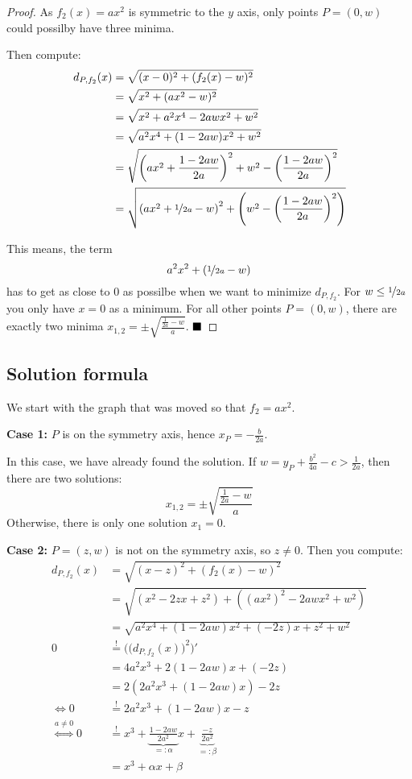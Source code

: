\begin{proof}
As $f_2(x) = ax^2$ is symmetric to the $y$ axis, only points 
$P = (0, w)$ could possilby have three minima.

Then compute:
\begin{align}
  d_{P,{f_2}}(x)  &= \sqrt{(x-0)^2 + (f_2(x)-w)^2}\\
    &= \sqrt{x^2 + (ax^2-w)^2}\\
    &= \sqrt{x^2 + a^2 x^4-2aw x^2+w^2}\\
    &= \sqrt{a^2 x^4 + (1-2aw) x^2 + w^2}\\
    &= \sqrt{\left (a x^2 + \frac{1-2 a w}{2a} \right )^2 + w^2 - \left (\frac{1-2 a w}{2a} \right )^2}\\
    &= \sqrt{\left (a x^2 + \nicefrac{1}{2a}- w \right )^2 + \left (w^2 - \left (\frac{1-2 a w}{2a} \right )^2 \right)}
\end{align}

This means, the term
\[a^2 x^2 + (\nicefrac{1}{2a}- w)\]
has to get as close to $0$ as possilbe when we want to minimize 
$d_{P,{f_2}}$. For $w \leq \nicefrac{1}{2a}$ you only have $x = 0$ as a minimum.
For all other points $P = (0, w)$, there are exactly two minima $x_{1,2} = \pm \sqrt{\frac{\frac{1}{2a} - w}{a}}$.
$\qed$
\end{proof}

\subsection{Solution formula}
We start with the graph that was moved so that $f_2 = ax^2$.

\textbf{Case 1:} $P$ is on the symmetry axis, hence $x_P = - \frac{b}{2a}$.

In this case, we have already found the solution. If $w = y_P + \frac{b^2}{4a} - c > \frac{1}{2a}$,
then there are two solutions:
\[x_{1,2} = \pm \sqrt{\frac{\frac{1}{2a} - w}{a}}\]
Otherwise, there is only one solution $x_1 = 0$.

\textbf{Case 2:} $P = (z, w)$ is not on the symmetry axis, so $z \neq 0$. Then you compute:
\begin{align}
  d_{P,{f_2}}(x)  &= \sqrt{(x-z)^2 + (f_2(x)-w)^2}\\
    &= \sqrt{(x^2 - 2zx + z^2) + ((ax^2)^2 - 2 awx^2 + w^2)}\\
    &= \sqrt{a^2x^4 + (1- 2 aw)x^2 +(- 2z)x + z^2 + w^2}\\
  0 &\stackrel{!}{=} \Big(\big(d_{P, {f_2}}(x)\big)^2\Big)' \\
    &= 4a^2x^3 + 2(1- 2 aw)x +(- 2z)\\
    &= 2 \left (2a^2x^3 + (1- 2 aw)x \right ) - 2z\\
    \Leftrightarrow 0 &\stackrel{!}{=} 2a^2x^3  + (1- 2 aw) x - z\\
\stackrel{a \neq 0}{\Leftrightarrow} 0 &\stackrel{!}{=} x^3 + \underbrace{\frac{1- 2 aw}{2 a^2}}_{=: \alpha} x  + \underbrace{\frac{-z}{2 a^2}}_{=: \beta}\\
    &= x^3 + \alpha x + \beta\label{eq:simple-cubic-equation-for-quadratic-distance}
\end{align}

